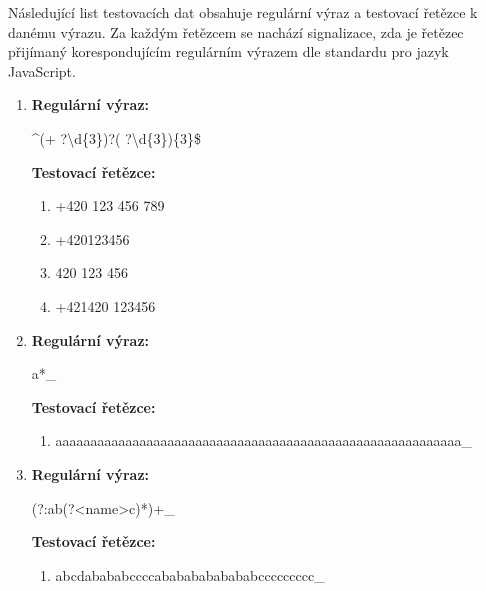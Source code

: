 \documentclass[czech,bachelor]{diploma}
\begin{document}
Následující list testovacích dat obsahuje regulární výraz a testovací řetězce k danému výrazu.
Za každým řetězcem se nachází signalizace, zda je řetězec přijímaný korespondujícím regulárním výrazem dle standardu pro jazyk JavaScript.

\begin{enumerate}
    \item
    \noindent\textbf{Regulární výraz:}

    \textasciicircum (+ ?\textbackslash d\{3\})?( ?\textbackslash d\{3\})\{3\}\$

    \noindent\textbf{Testovací řetězce:}

    \begin{enumerate}
        \item +420 123 456 789 \setlength\parindent{1em} \textcolor{OliveGreen}{\Checkmark} \label{itm:TD_1a}
        \item +420123456 \setlength\parindent{1em} \textcolor{Red}{\XSolid} \label{itm:TD_1b}
        \item 420 123 456 \setlength\parindent{1em} \textcolor{OliveGreen}{\Checkmark} \label{itm:TD_1c}
        \item +421420 123456 \setlength\parindent{1em} \textcolor{OliveGreen}{\Checkmark} \label{itm:TD_1d}
    \end{enumerate}


    \item
    \noindent\textbf{Regulární výraz:} 

    a*\_

    \noindent\textbf{Testovací řetězce:}

    \begin{enumerate}
        \item aaaaaaaaaaaaaaaaaaaaaaaaaaaaaaaaaaaaaaaaaaaaaaaaaaaaaaaaaa\_ \setlength\parindent{1em} \textcolor{OliveGreen}{\Checkmark} \label{itm:TD_2a}
    \end{enumerate}


    \item 
    \noindent\textbf{Regulární výraz:} 

    (?:ab(?<name>c)*)+\_

    \noindent\textbf{Testovací řetězce:}

    \begin{enumerate}
        \item abcdabababccccabababababababccccccccc\_ \setlength\parindent{1em} \textcolor{OliveGreen}{\Checkmark} \label{itm:TD_3a}
    \end{enumerate}



\end{enumerate}
\end{document}
